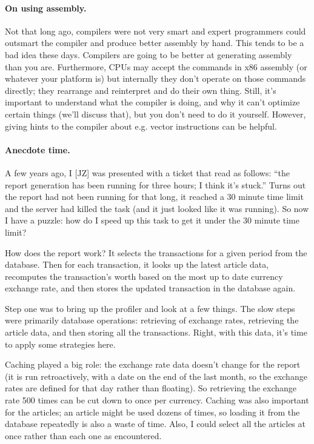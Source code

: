 \documentclass[a4paper]{report}
\begin{document}
\paragraph{On using assembly.} Not that long ago, compilers were not very smart and expert programmers could outsmart the compiler and produce better assembly by hand. This tends to be a bad idea these days. Compilers are going to be better at generating assembly than you are. Furthermore, CPUs may accept the commands in x86 assembly (or whatever your platform is) but internally they don't operate on those commands directly; they rearrange and reinterpret and do their own thing. Still, it's important to understand what the compiler is doing, and why it can't optimize certain things (we'll discuss that), but you don't need to do it yourself. However, giving hints to the compiler about e.g. vector instructions can be helpful.

\paragraph{Anecdote time.} A few years ago, I [JZ] was presented with a ticket that read as follows: ``the report generation has been running for three hours; I think it's stuck.'' Turns out the report had not been running for that long, it reached a 30 minute time limit and the server had killed the task (and it just looked like it was running). So now I have a puzzle: how do I speed up this task to get it under the 30 minute time limit?

How does the report work? It selects the transactions for a given period from the database. Then for each transaction, it looks up the latest article data, recomputes the transaction's worth based on the most up to date currency exchange rate, and then stores the updated transaction in the database again.

Step one was to bring up the profiler and look at a few things. The slow steps were primarily database operations: retrieving of exchange rates, retrieving the article data, and then storing all the transactions. Right, with this data, it's time to apply some strategies here.

Caching played a big role: the exchange rate data doesn't change for the report (it is run retroactively, with a date on the end of the last month, so the exchange rates are defined for that day rather than floating). So retrieving the exchange rate 500 times can be cut down to once per currency. Caching was also important for the articles; an article might be used dozens of times, so loading it from the database repeatedly is also a waste of time. Also, I could select all the articles at once rather than each one as encountered.
\end{document}
